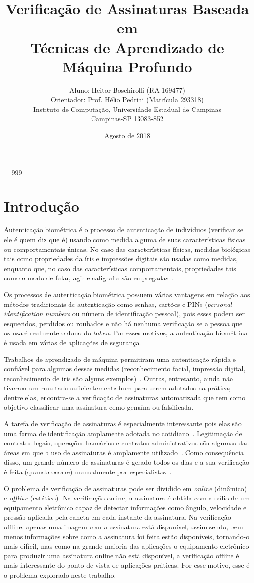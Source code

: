 \documentclass[11pt, twocolumn, a4paper]{article}
\title{Verificação de Assinaturas Baseada em \\ Técnicas de Aprendizado de Máquina Profundo}
\author{Aluno: Heitor Boschirolli (RA 169477) \\ Orientador: Prof. Hélio Pedrini (Matrícula 293318) \\[0.2cm] Instituto de Computação, Universidade Estadual de Campinas \\ Campinas-SP 13083-852}
\date{Agosto de 2018}
\begin{document}
\tolerance = 999
\sloppy

\maketitle

\section{Introdução}

Autenticação biométrica é o processo de autenticação de indivíduos (verificar se ele é quem diz que é) usando como medida alguma de suas características físicas ou comportamentais únicas. No caso das características físicas, medidas biológicas tais como propriedades da íris e impressões digitais são usadas como medidas, enquanto que, no caso das características comportamentais, propriedades tais como o modo de falar, agir e caligrafia são empregadas~\cite{hafemann}.

Os processos de autenticação biométrica possuem várias vantagens em relação aos métodos tradicionais de autenticação como senhas, cartões e PINs ({\it personal identification numbers} ou número de identificação pessoal), pois esses podem ser esquecidos, perdidos ou roubados e não há nenhuma verificação se a pessoa que os usa é realmente o dono do {\it token}. Por esses motivos, a autenticação biométrica é usada em várias de aplicações de segurança.

Trabalhos de aprendizado de máquina permitiram uma autenticação rápida e confiável para algumas dessas medidas (reconhecimento facial, impressão digital, reconhecimento de iris são alguns exemplos)~\cite{alvarez}. Outras, entretanto, ainda não tiveram um resultado suficientemente bom para serem adotados na prática; dentre elas, encontra-se a verificação de assinaturas automatizada que tem como objetivo classificar uma assinatura como genuína ou falsificada.

A tarefa de verificação de assinaturas é especialmente interessante pois elas são uma forma de identificação amplamente adotada no cotidiano~\cite{plamodon}. Legitimação de contratos legais, operações bancárias e contratos administrativos são algumas das áreas em que o uso de assinaturas é amplamente utilizado~\cite{hannes}. Como consequência disso, um grande número de assinaturas é gerado todos os dias e a sua verificação é feita (quando ocorre) manualmente por especialistas~\cite{hannes}.

O problema de verificação de assinaturas pode ser dividido em {\it online} (dinâmico) e {\it offline} (estático). Na verificação online, a assinatura é obtida com auxílio de um equipamento eletrônico capaz de detectar informações como ângulo, velocidade e pressão aplicada pela caneta em cada instante da assinatura. Na verificação offline, apenas uma imagem com a assinatura está disponível; assim sendo, bem menos informações sobre como a assinatura foi feita estão disponíveis, tornando-o mais difícil, mas como na grande maioria das aplicações o equipamento eletrônico para produzir uma assinatura online não está disponível, a verificação offline é mais interessante do ponto de vista de aplicações práticas. Por esse motivo, esse é o problema explorado neste trabalho.
\end{document}
